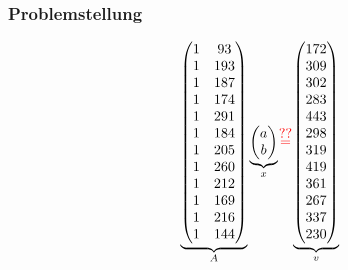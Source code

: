 \documentclass{beamer}
\newcommand\myeq{\stackrel{\mathclap{\normalfont\mbox{??}}}{=}}
\begin{document}
\begin{frame}
    \frametitle{Problemstellung}
    \small
    \begin{align*}
        \underbrace{
        \begin{pmatrix}
            1 &  93 \\
            1 & 193 \\
            1 & 187 \\
            1 & 174 \\
            1 & 291 \\
            1 & 184 \\
            1 & 205 \\
            1 & 260 \\
            1 & 212 \\
            1 & 169 \\
            1 & 216 \\
            1 & 144
        \end{pmatrix}
        }_A
        \underbrace{
        \begin{pmatrix}
            a \\ b
        \end{pmatrix}
        }_x
        {\color{red}\myeq}
        \underbrace{
        \begin{pmatrix}        
            172 \\
            309 \\
            302 \\
            283 \\
            443 \\
            298 \\
            319 \\
            419 \\
            361 \\
            267 \\
            337 \\
            230
        \end{pmatrix}
        }_v
    \end{align*}
\end{frame}
\end{document}
